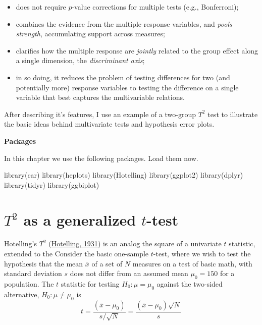 \documentclass[
  letterpaper,
  10pt,
  krantz2]{krantz}
\makeatletter
\newenvironment{Shaded}{\begin{snugshade}}{\end{snugshade}}
\newcommand{\FunctionTok}[1]{\textcolor[rgb]{0.28,0.35,0.67}{#1}}
\newcommand{\NormalTok}[1]{\textcolor[rgb]{0.00,0.23,0.31}{#1}}
\providecommand{\tightlist}{%
  \setlength{\itemsep}{0pt}\setlength{\parskip}{0pt}}\usepackage{longtable,booktabs,array}
\newenvironment{kframe}{%
  \medskip{}
  \setlength{\fboxsep}{.8em}
  \def\at@end@of@kframe{}%
  \ifinner\ifhmode%
  \def\at@end@of@kframe{\end{minipage}}%
  \begin{minipage}{\columnwidth}%
  \fi\fi%
  \def\FrameCommand##1{\hskip\@totalleftmargin \hskip-\fboxsep
  \colorbox{shadecolor}{##1}\hskip-\fboxsep
      \hskip-\linewidth \hskip-\@totalleftmargin \hskip\columnwidth}%
  \MakeFramed {\advance\hsize-\width
    \@totalleftmargin\z@ \linewidth\hsize
    \@setminipage}}%
{\par\unskip\endMakeFramed%
  \at@end@of@kframe}
\renewenvironment{Shaded}{\begin{kframe}}{\end{kframe}}
\makeatother
\begin{document}
\begin{itemize}
\tightlist
\item
  does not require \(p\)-value corrections for multiple tests (e.g.,
  Bonferroni);
\item
  combines the evidence from the multiple response variables, and
  \emph{pools strength}, accumulating support across measures;
\item
  clarifies how the multiple response are \emph{jointly} related to the
  group effect along a single dimension, the \emph{discriminant axis};
\item
  in so doing, it reduces the problem of testing differences for two
  (and potentially more) response variables to testing the difference on
  a single variable that best captures the multivariable relations.
\end{itemize}

After describing it's features, I use an example of a two-group \(T^2\)
test to illustrate the basic ideas behind multivariate tests and
hypothesis error plots.

\textbf{Packages}

In this chapter we use the following packages. Load them now.

\begin{Shaded}
\begin{Highlighting}[]
\FunctionTok{library}\NormalTok{(car)}
\FunctionTok{library}\NormalTok{(heplots)}
\FunctionTok{library}\NormalTok{(Hotelling)}
\FunctionTok{library}\NormalTok{(ggplot2)}
\FunctionTok{library}\NormalTok{(dplyr)}
\FunctionTok{library}\NormalTok{(tidyr)}
\FunctionTok{library}\NormalTok{(ggbiplot)}
\end{Highlighting}
\end{Shaded}

\hypertarget{t2-as-a-generalized-t-test}{%
\section{\texorpdfstring{\(T^2\) as a generalized
\(t\)-test}{T\^{}2 as a generalized t-test}}\label{t2-as-a-generalized-t-test}}

Hotelling's \(T^2\) (\protect\hyperlink{ref-Hotelling:1931}{Hotelling,
1931}) is an analog the square of a univariate \(t\) statistic, extended
to the Consider the basic one-sample \(t\)-test, where we wish to test
the hypothesis that the mean \(\bar{x}\) of a set of \(N\) measures on a
test of basic math, with standard deviation \(s\) does not differ from
an assumed mean \(\mu_0 = 150\) for a population. The \(t\) statistic
for testing \(H_0 : \mu = \mu_0\) against the two-sided alternative,
\(H_0 : \mu \ne \mu_0\) is \[
t = \frac{(\bar{x} - \mu_0)}{s / \sqrt{N}} = \frac{(\bar{x} - \mu_0)\sqrt{N}}{s}
\]
\end{document}

